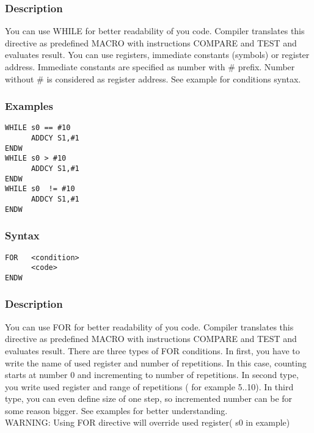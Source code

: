     \subsubsection{Description}
        You can use WHILE for better readability of you code. Compiler translates this directive as predefined MACRO with instructions COMPARE and TEST and evaluates result. You can use registers, immediate constants (symbols) or register address. Immediate constants are specified as number with \# prefix. Number without \# is considered as register address. See example for conditions syntax.

    \subsubsection{Examples}
        \verb'WHILE s0 == #10'\\
        \verb'      ADDCY S1,#1'\\
        \verb'ENDW'
        \verb''\\
        \verb'WHILE s0 > #10'\\
        \verb'      ADDCY S1,#1'\\
        \verb'ENDW'
        \verb''\\
        \verb'WHILE s0  != #10'\\
        \verb'      ADDCY S1,#1'\\
        \verb'ENDW'

    \subsubsection{Syntax}
        \verb'FOR   <condition>'\\
        \verb'      <code>'\\
        \verb'ENDW'

    \subsubsection{Description}
        You can use FOR for better readability of you code. Compiler translates this directive as predefined MACRO with instructions COMPARE and TEST and evaluates result. There are three types of FOR conditions. In first, you have to write the name of used register and number of repetitions. In this case, counting starts at number 0 and incrementing to number of repetitions. In second type, you write used register and range of repetitions ( for example 5..10). In third type, you can even define size of one step, so incremented number can be for some reason bigger. See examples for better understanding.\\ WARNING: Using FOR directive will override used register( s0 in example)

